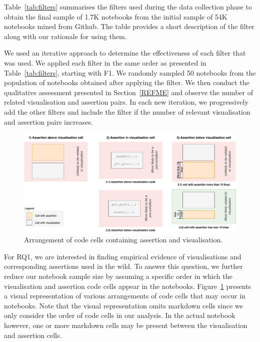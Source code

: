 \documentclass[acmsmall,screen,review,anonymous]{acmart}
\begin{document}
Table~\ref{tab:filters} summarises the filters used during the data
collection phase to obtain the final sample of 1.7K notebooks from the
initial sample of 54K notebooks mined from Github. The table provides
a short description of the filter along with our rationale for using
them.

We used an iterative approach to determine the effectiveness of each
filter that was used. We applied each filter in the same order as
presented in Table~\ref{tab:filters}, starting with F1. We randomly
sampled 50 notebooks from the population of notebooks obtained after
applying the filter. We then conduct the qualitative assessment
presented in Section~\ref{REFME} and observe the number of related
visualisation and assertion pairs. In each new iteration, we
progressively add the other filters and include the filter if the
number of relevant visualisation and assertion pairs increases.

\begin{figure}
  \centering
  \includegraphics[width=\textwidth]{nb-structure.pdf}
  \caption{Arrangement of code cells containing assertion and
    visualisation.}
  \label{fig:cell-arrangement}
\end{figure}

For RQ1, we are interested in finding empirical evidence of visualisations and corresponding assertions used in the wild. To answer this question, we further reduce our notebook sample size by assuming a specific order in which the visualisation and assertion code cells appear in the notebooks. Figure~\ref{fig:cell-arrangement} presents a visual representation of various arrangements of code cells that may occur in notebooks. Note that the visual representation omits markdown cells since we only consider the order of code cells in our analysis. In the actual notebook however, one or more markdown cells may be present between the visualisation and assertion cells.
\end{document}
